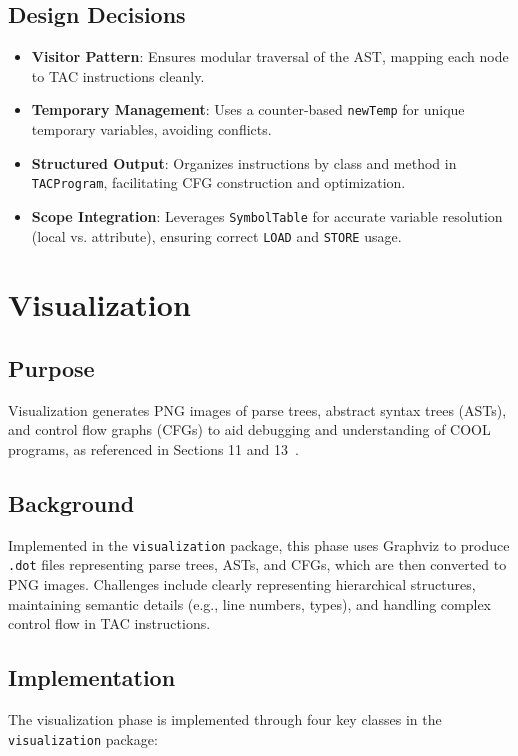 \documentclass[11pt, titlepage]{article}
\begin{document}
\subsection{Design Decisions}
\begin{itemize}[leftmargin=*]
    \item \textbf{Visitor Pattern}: Ensures modular traversal of the AST, mapping each node to TAC instructions cleanly.
    \item \textbf{Temporary Management}: Uses a counter-based \texttt{newTemp} for unique temporary variables, avoiding conflicts.
    \item \textbf{Structured Output}: Organizes instructions by class and method in \texttt{TACProgram}, facilitating CFG construction and optimization.
    \item \textbf{Scope Integration}: Leverages \texttt{SymbolTable} for accurate variable resolution (local vs. attribute), ensuring correct \texttt{LOAD} and \texttt{STORE} usage.
\end{itemize}

\section{Visualization}
\label{sec:visualization}

\subsection{Purpose}
Visualization generates PNG images of parse trees, abstract syntax trees (ASTs), and control flow graphs (CFGs) to aid debugging and understanding of COOL programs, as referenced in Sections 11 and 13~\cite{cool_manual}.

\subsection{Background}
Implemented in the \texttt{visualization} package, this phase uses Graphviz to produce \texttt{.dot} files representing parse trees, ASTs, and CFGs, which are then converted to PNG images. Challenges include clearly representing hierarchical structures, maintaining semantic details (e.g., line numbers, types), and handling complex control flow in TAC instructions.

\subsection{Implementation}
The visualization phase is implemented through four key classes in the \texttt{visualization} package:
\end{document}

